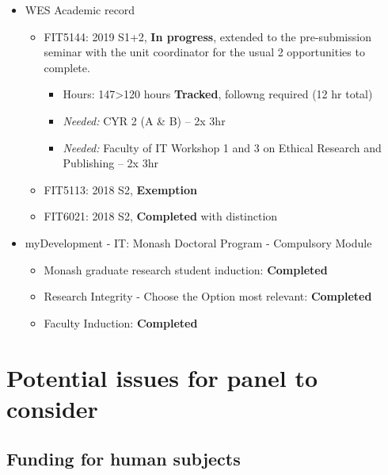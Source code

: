 \documentclass[
  11,
]{article}
\providecommand{\tightlist}{%
  \setlength{\itemsep}{0pt}\setlength{\parskip}{0pt}}
\begin{document}
\begin{itemize}
\tightlist
\item
  WES Academic record

  \begin{itemize}
  \tightlist
  \item
    FIT5144: 2019 S1+2, \textbf{In progress}, extended to the pre-submission seminar with the unit coordinator for the usual 2 opportunities to complete.

    \begin{itemize}
    \tightlist
    \item
      Hours: 147\textgreater120 hours \textbf{Tracked}, followng required (12 hr total)
    \item
      \emph{Needed:} CYR 2 (A \& B) -- 2x 3hr
    \item
      \emph{Needed:} Faculty of IT Workshop 1 and 3 on Ethical Research and Publishing -- 2x 3hr
    \end{itemize}
  \item
    FIT5113: 2018 S2, \textbf{Exemption}
  \item
    FIT6021: 2018 S2, \textbf{Completed} with distinction
  \end{itemize}
\item
  myDevelopment - IT: Monash Doctoral Program - Compulsory Module

  \begin{itemize}
  \tightlist
  \item
    Monash graduate research student induction: \textbf{Completed}
  \item
    Research Integrity - Choose the Option most relevant: \textbf{Completed}
  \item
    Faculty Induction: \textbf{Completed}
  \end{itemize}
\end{itemize}

\hypertarget{potential-issues-for-panel-to-consider}{%
\section{Potential issues for panel to consider}\label{potential-issues-for-panel-to-consider}}

\hypertarget{funding-for-human-subjects}{%
\subsection{Funding for human subjects}\label{funding-for-human-subjects}}
\end{document}

